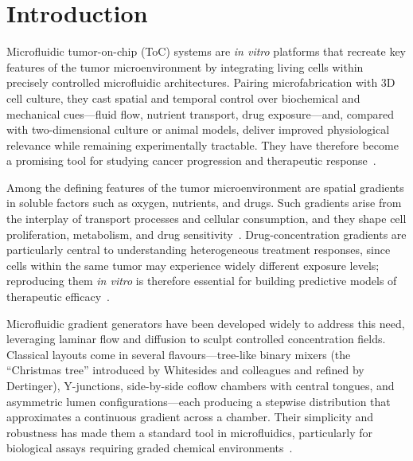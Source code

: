 \documentclass[12pt]{article}
\begin{document}
\section{Introduction}
Microfluidic tumor-on-chip (ToC) systems are \textit{in vitro} platforms that recreate key features of the tumor microenvironment by integrating living cells within precisely controlled microfluidic architectures. Pairing microfabrication with 3D cell culture, they cast spatial and temporal control over biochemical and mechanical cues---fluid flow, nutrient transport, drug exposure---and, compared with two-dimensional culture or animal models, deliver improved physiological relevance while remaining experimentally tractable. They have therefore become a promising tool for studying cancer progression and therapeutic response~\cite{liu2021tumor}.

Among the defining features of the tumor microenvironment are spatial gradients in soluble factors such as oxygen, nutrients, and drugs. Such gradients arise from the interplay of transport processes and cellular consumption, and they shape cell proliferation, metabolism, and drug sensitivity~\cite{guerrero2026matrix}. Drug-concentration gradients are particularly central to understanding heterogeneous treatment responses, since cells within the same tumor may experience widely different exposure levels; reproducing them \textit{in vitro} is therefore essential for building predictive models of therapeutic efficacy~\cite{shen2020concentration}.

Microfluidic gradient generators have been developed widely to address this need, leveraging laminar flow and diffusion to sculpt controlled concentration fields. Classical layouts come in several flavours---tree-like binary mixers (the ``Christmas tree'' introduced by Whitesides and colleagues and refined by Dertinger), Y-junctions, side-by-side coflow chambers with central tongues, and asymmetric lumen configurations---each producing a stepwise distribution that approximates a continuous gradient across a chamber. Their simplicity and robustness has made them a standard tool in microfluidics, particularly for biological assays requiring graded chemical environments~\cite{jeon2000generation,dertinger2001generation,ayuso2021microfluidic}.
\end{document}
